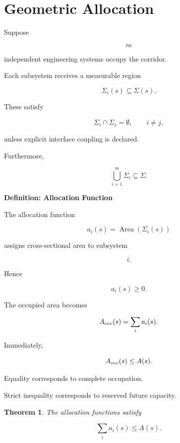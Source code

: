 \documentclass[11pt,fleqn]{book}
\numberwithin{equation}{chapter}
\newenvironment{definition}[1]
  {\begin{definitionEnv}
   \noindent\textbf{Definition: #1}\par\smallskip}
  {\end{definitionEnv}}
\theoremstyle{plain}
\newtheorem{theorem}{Theorem}[chapter]
\theoremstyle{definition}
\theoremstyle{remark}
\begin{document}

\section{Geometric Allocation}

Suppose

\[
m
\]

independent engineering systems occupy the corridor.

Each subsystem receives a measurable region

\[
\Sigma_i(s)
\subseteq
\Sigma(s).
\]

These satisfy

\[
\Sigma_i
\cap
\Sigma_j
=
\emptyset,
\qquad
i\neq j,
\]

unless explicit interface coupling is declared.

Furthermore,

\[
\bigcup_{i=1}^{m}
\Sigma_i
\subseteq
\Sigma.
\]


\begin{definition}{Allocation Function}

The allocation function

\[
a_i(s)
=
\operatorname{Area}
(
\Sigma_i(s)
)
\]

assigns cross-sectional area to subsystem

\[
i.
\]

Hence

\[
a_i(s)\ge0.
\]

The occupied area becomes

\[
A_{\rm occ}(s)
=
\sum_i
a_i(s).
\]

\end{definition}


Immediately,

\[
A_{\rm occ}(s)
\le
A(s).
\]

Equality corresponds to complete occupation.

Strict inequality corresponds to reserved future capacity.


\begin{theorem}

The allocation functions satisfy

\[
\sum_i
a_i(s)
\le
A(s).
\]

\end{theorem}
\end{document}
